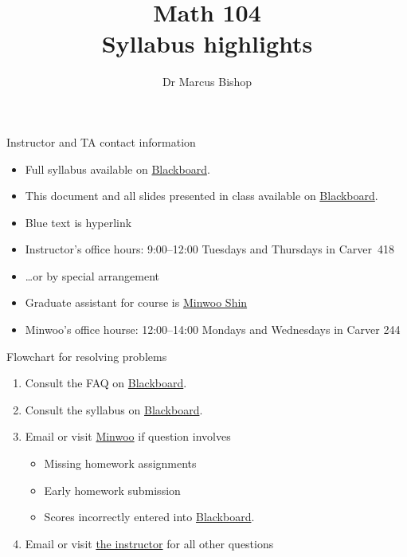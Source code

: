 \documentclass[xcolor=dvipsnames]{beamer}
\title[Syllabus highlights]{Math 104\\Syllabus highlights}
\author{Dr Marcus Bishop}
\theoremstyle{definition}
\begin{document}
\begin{frame}\titlepage\end{frame}
\LogoOff

\begin{frame}{Instructor and TA contact information}
\begin{itemize}
\item Full syllabus available on
\href{https://bb.its.iastate.edu}{\color{blue} Blackboard}.
\item This document and all slides presented in class
available on
\href{https://bb.its.iastate.edu}{\color{blue} Blackboard}.
\item Blue text is hyperlink
\item Instructor's office hours:
9:00--12:00 Tuesdays and Thursdays in Carver~418
\item \dots or by special arrangement
\item Graduate assistant for course is
\href{mailto:mws@iastate.edu}{\color{blue} Minwoo Shin}
\item Minwoo's office hourse:
12:00--14:00 Mondays and Wednesdays in Carver 244
\end{itemize}
\end{frame}

\begin{frame}{Flowchart for resolving problems}
\begin{enumerate}
\item Consult the FAQ on
\href{https://bb.its.iastate.edu}{\color{blue} Blackboard}.
\item Consult the syllabus on
\href{https://bb.its.iastate.edu}{\color{blue} Blackboard}.
\item Email or visit \href{mailto:mws@iastate.edu}{\color{blue}Minwoo}
if question involves
\begin{itemize}
\item Missing homework assignments
\item Early homework submission
\item Scores incorrectly entered into
\href{https://bb.its.iastate.edu}{\color{blue} Blackboard}.
\end{itemize}
\item Email or visit \href{mailto:mbishop@iastate.edu}{\color{blue}the instructor}
for all other questions
\end{enumerate}
\end{frame}
\end{document}
